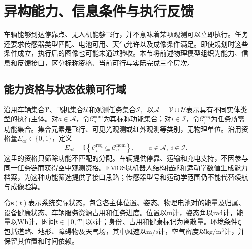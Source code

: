 \section{异构能力、信息条件与执行反馈}
\label{sec:04_09}

车辆能够到达停靠点、无人机能够飞行，并不意味着某项观测可以立即执行。任务还要求传感器类型匹配、电池可用、天气允许以及成像条件满足。即使规划时这些条件成立，执行后的图像也可能未通过验收。本节将前述物理模型组织为能力、信息和反馈接口，区分标称资格、当前可行与实际完成三个层次。

\subsection{能力资格与状态依赖可行域}

沿用车辆集合$\mathcal V$、飞机集合$\mathcal U$和观测任务集合$\mathcal I$，以$\mathcal A=\mathcal V\mathbin{\dot\cup}\mathcal U$表示具有不同实体类型的执行主体。对$a\in\mathcal A$，令$\mathcal C_a^{\mathrm{nom}}$为其标称功能集合；对$i\in\mathcal I$，令$\mathcal C_i^{\mathrm{req}}$为任务所需功能集合。集合元素是飞行、可见光观测或红外观测等类别，无物理单位。沿用资格量$E_{ai}\in\{0,1\}$，定义
\begin{equation}
E_{ai}=\mathbb I\!\left\{\mathcal C_i^{\mathrm{req}}\subseteq\mathcal C_a^{\mathrm{nom}}\right\},
\qquad a\in\mathcal A,\ i\in\mathcal I.
\label{s0409:eligibility}
\end{equation}
这里的资格只筛除功能不匹配的分配。车辆提供停靠、运输和充电支持，不因参与同一任务链而获得空中观测资格。EMOS以机器人结构描述和运动学数值生成能力档案，为这种功能筛选提供了接口思路\cite{EMOS2025}；传感器型号和运动学范围仍不能代替续航与成像验算。

令$\mathbf s(t)$表示系统实际状态，包含各主体位置、姿态、物理电池对的能量及归属、设备健康状态、车辆服务资源占用和任务进度。位置以$\mathrm m$计，姿态角以$\mathrm{rad}$计，能量以$\mathrm{Wh}$计，时间$t\in[0,T]$以$\mathrm s$计；身份、占用和健康标记为离散量。环境条件$\boldsymbol\zeta$包括道路、地形、障碍物及天气场，其中风速以$\mathrm{m/s}$计，空气密度以$\mathrm{kg/m^3}$计，并保留其位置和时间依赖。

